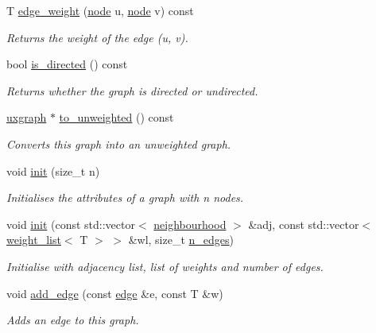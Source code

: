 \begin{DoxyCompactItemize}
T \hyperlink{classlgraph_1_1wdgraph_a319aea927db9734903b4cf7d147ad687}{edge\+\_\+weight} (\hyperlink{namespacelgraph_a397169dd66adf725210a30fb7251773e}{node} u, \hyperlink{namespacelgraph_a397169dd66adf725210a30fb7251773e}{node} v) const
\begin{DoxyCompactList}\small\item\em Returns the weight of the edge ({\itshape u}, {\itshape v}). \end{DoxyCompactList}\item 
bool \hyperlink{classlgraph_1_1wdgraph_ab167f7c833e7db1a74e65a187f583ed4}{is\+\_\+directed} () const
\begin{DoxyCompactList}\small\item\em Returns whether the graph is directed or undirected. \end{DoxyCompactList}\item 
\hyperlink{classlgraph_1_1uxgraph}{uxgraph} $\ast$ \hyperlink{classlgraph_1_1wdgraph_ac4af8d76693facea90dc27d10e93c8f0}{to\+\_\+unweighted} () const
\begin{DoxyCompactList}\small\item\em Converts this graph into an unweighted graph. \end{DoxyCompactList}\item 
void \hyperlink{classlgraph_1_1wxgraph_aa09f37bf4a34a0f4f002587203df0125}{init} (size\+\_\+t n)
\begin{DoxyCompactList}\small\item\em Initialises the attributes of a graph with {\itshape n} nodes. \end{DoxyCompactList}\item 
void \hyperlink{classlgraph_1_1wxgraph_a851ab43d7658c185831413394ef915a9}{init} (const std\+::vector$<$ \hyperlink{namespacelgraph_a052e7766c13f3a43cec0aec8173fdede}{neighbourhood} $>$ \&adj, const std\+::vector$<$ \hyperlink{namespacelgraph_a1e0fd5ef0a78b2a92da48adbed265cb6}{weight\+\_\+list}$<$ T $>$ $>$ \&wl, size\+\_\+t \hyperlink{classlgraph_1_1xxgraph_af00bce8b07a42754601d1e3bebe2c1fa}{n\+\_\+edges})
\begin{DoxyCompactList}\small\item\em Initialise with adjacency list, list of weights and number of edges. \end{DoxyCompactList}\item 
void \hyperlink{classlgraph_1_1wxgraph_a6b2aab113f6ce118ff437c6c182d9c6c}{add\+\_\+edge} (const \hyperlink{namespacelgraph_a76bd7d50719f03de7a85db259d80d572}{edge} \&e, const T \&w)
\begin{DoxyCompactList}\small\item\em Adds an edge to this graph. \end{DoxyCompactList}\item 

\end{DoxyCompactItemize}
